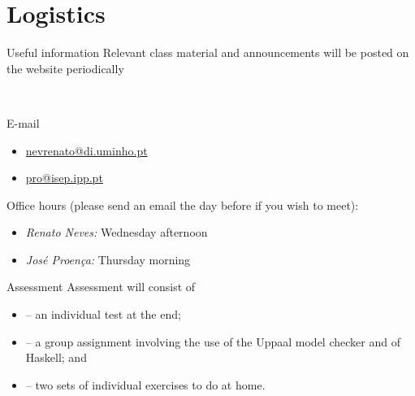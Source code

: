 \documentclass[aspectratio=169]{beamer}
\begin{document}
\section{Logistics}

\begin{frame}{Useful information}
  Relevant class material and announcements will be posted on the website periodically

  \\


  \alert{E-mail}
    \begin{itemize}
      \item \href{mailto:nevrenato@di.uminho.pt}{nevrenato@di.uminho.pt}
      \item \href{mailto:pro@isep.ipp.pt}{pro@isep.ipp.pt} 
    \end{itemize}
           

  \alert{Office hours} (please send an email the day before if you wish to meet):
  \begin{itemize}
    \item \emph{Renato Neves:} Wednesday afternoon
    \item \emph{José Proença:} Thursday morning
  \end{itemize} 
\end{frame}

\begin{frame}{Assessment}
  Assessment will consist of
  \begin{itemize}
  \item {} -- an individual \alert{test} at the end;
  \item {} -- a \alert{group assignment} involving the use of the Uppaal model checker and of Haskell; and %
  \item {} -- two sets of \alert{individual exercises} to do at home.
  \end{itemize}
\end{frame}
\end{document}
